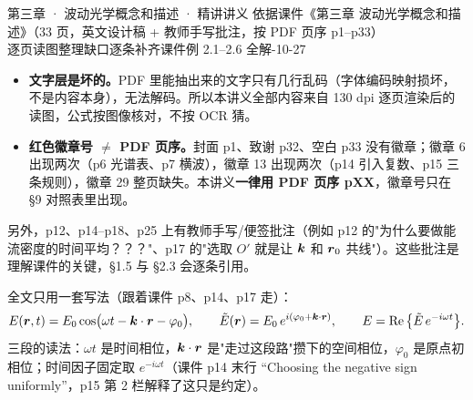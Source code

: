 \documentclass[10pt]{ctexart}
\newcommand{\Etil}{\tilde{E}}
\begin{document}
{第三章 · 波动光学概念和描述 · 精讲讲义}
{依据课件《第三章 波动光学概念和描述》（33 页，英文设计稿 + 教师手写批注，按 PDF 页序 p1--p33）\\
逐页读图整理\quad 缺口逐条补齐\quad 课件例 2.1--2.6 全解-10-27}




\begin{itemize}
\item \textbf{文字层是坏的。}PDF 里能抽出来的文字只有几行乱码（字体编码映射损坏，不是内容本身），无法解码。所以本讲义全部内容来自 130 dpi 逐页渲染后的读图，公式按图像核对，不按 OCR 猜。
\item \textbf{红色徽章号 $\ne$ PDF 页序。}封面 p1、致谢 p32、空白 p33 没有徽章；徽章 6 出现两次（p6 光谱表、p7 横波），徽章 13 出现两次（p14 引入复数、p15 三条规则），徽章 29 整页缺失。本讲义\textbf{一律用 PDF 页序 pXX}，徽章号只在 §9 对照表里出现。
\end{itemize}

另外，p12、p14--p18、p25 上有教师手写/便签批注（例如 p12 的"为什么要做能流密度的时间平均？？？"、p17 的"选取 $O'$ 就是让 $\boldsymbol{k}$ 和 $\boldsymbol{r}_0$ 共线"）。这些批注是理解课件的关键，§1.5 与 §2.3 会逐条引用。


全文只用一套写法（跟着课件 p8、p14、p17 走）：
\[
E(\vect r,t)=E_0\cos\!\big(\omega t-\vect k\cdot\vect r-\varphi_0\big),
\qquad
\Etil(\vect r)=E_0\,e^{i(\varphi_0+\vect k\cdot\vect r)},
\qquad
E=\operatorname{Re}\big\{\Etil\,e^{-i\omega t}\big\}.
\]
三段的读法：$\omega t$ 是时间相位，$\boldsymbol{k}\cdot\boldsymbol{r}$ 是"走过这段路"攒下的空间相位，$\varphi_0$ 是原点初相位；时间因子固定取 $e^{-i\omega t}$（课件 p14 末行 “Choosing the negative sign uniformly”，p15 第 2 栏解释了这只是约定）。
\end{document}
